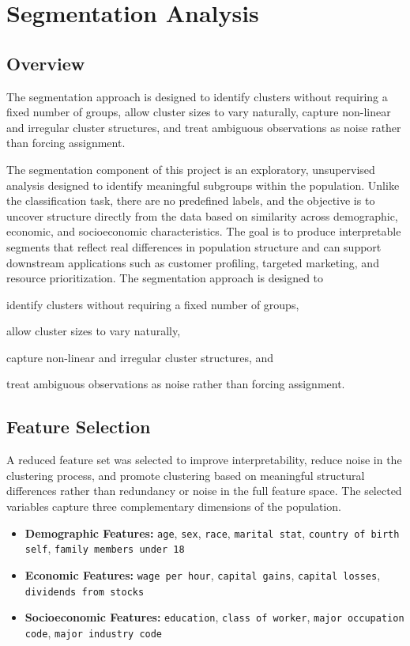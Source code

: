 
\section{Segmentation Analysis}

\subsection{Overview}

The segmentation approach is designed to identify clusters without requiring a fixed number of groups, allow cluster sizes to vary naturally, capture non-linear and irregular cluster structures, and treat ambiguous observations as noise rather than forcing assignment.

The segmentation component of this project is an exploratory, unsupervised analysis designed to identify meaningful subgroups within the population. Unlike the classification task, there are no predefined labels, and the objective is to uncover structure directly from the data based on similarity across demographic, economic, and socioeconomic characteristics. The goal is to produce interpretable segments that reflect real differences in population structure and can support downstream applications such as customer profiling, targeted marketing, and resource prioritization. The segmentation approach is designed to
\begin{enumerate*}[label=(\roman*)]
	\item identify clusters without requiring a fixed number of groups,
	\item allow cluster sizes to vary naturally,
	\item capture non-linear and irregular cluster structures, and
	\item treat ambiguous observations as noise rather than forcing assignment.
\end{enumerate*}

\subsection{Feature Selection}

A reduced feature set was selected to improve interpretability, reduce noise in the clustering process, and promote clustering based on meaningful structural differences rather than redundancy or noise in the full feature space. The selected variables capture three complementary dimensions of the population.
\begin{itemize}
	\item \textbf{Demographic Features:} \texttt{age}, \texttt{sex}, \texttt{race}, \texttt{marital stat}, \texttt{country of birth self}, \texttt{family members under 18}
	\item \textbf{Economic Features:} \texttt{wage per hour}, \texttt{capital gains}, \texttt{capital losses}, \texttt{dividends from stocks}
	\item \textbf{Socioeconomic Features:} \texttt{education}, \texttt{class of worker}, \texttt{major occupation code}, \texttt{major industry code}
\end{itemize}

